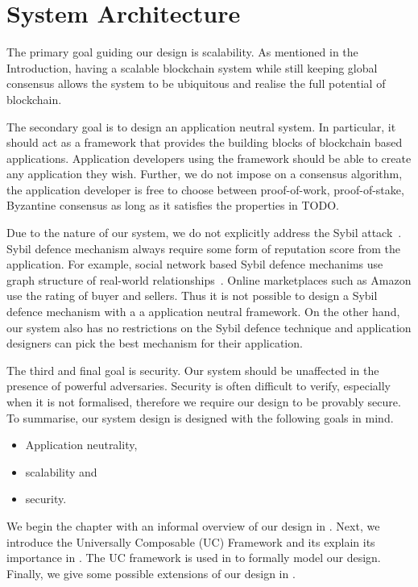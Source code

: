 \chapter{System Architecture}
\label{ch:model}

The primary goal guiding our design is scalability.
As mentioned in the Introduction, having a scalable blockchain system while still keeping global consensus
allows the system to be ubiquitous and realise the full potential of blockchain.

The secondary goal is to design an application neutral system.
In particular, it should act as a framework that provides the building blocks of blockchain based applications.
Application developers using the framework should be able to create any application they wish.
Further, we do not impose on a consensus algorithm,
the application developer is free to choose between proof-of-work, proof-of-stake,
Byzantine consensus as long as it  satisfies the properties in TODO.

Due to the nature of our system, we do not explicitly address the Sybil attack~\cite{douceur2002sybil}.
Sybil defence mechanism always require some form of reputation score from the application.
For example, social network based Sybil defence mechanims use graph structure of real-world relationships~\cite{yu2006sybilguard}.
Online marketplaces such as Amazon use the rating of buyer and sellers.
Thus it is not possible to design a Sybil defence mechanism with a a application neutral framework.
On the other hand, our system also has no restrictions on the Sybil defence technique
and application designers can pick the best mechanism for their application.

The third and final goal is security.
Our system should be unaffected in the presence of powerful adversaries.
Security is often difficult to verify, especially when it is not formalised, therefore we require our design to be provably secure.
To summarise, our system design is designed with the following goals in mind.
\begin{itemize}
    \item Application neutrality,
    \item scalability and
    \item security.
\end{itemize}

We begin the chapter with an informal overview of our design in .
Next, we introduce the Universally Composable (UC) Framework and its explain its importance in .
The UC framework is used in  to formally model our design.
Finally, we give some possible extensions of our design in .

